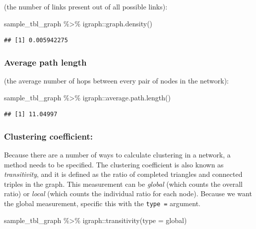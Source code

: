\documentclass[
]{book}
\newenvironment{Shaded}{\begin{snugshade}}{\end{snugshade}}
\newcommand{\AttributeTok}[1]{\textcolor[rgb]{0.77,0.63,0.00}{#1}}
\newcommand{\FunctionTok}[1]{\textcolor[rgb]{0.00,0.00,0.00}{#1}}
\newcommand{\NormalTok}[1]{#1}
\newcommand{\SpecialCharTok}[1]{\textcolor[rgb]{0.00,0.00,0.00}{#1}}
\newcommand{\StringTok}[1]{\textcolor[rgb]{0.31,0.60,0.02}{#1}}
\begin{document}
(the number of links present out of all possible links):

\begin{Shaded}
\begin{Highlighting}[]
\NormalTok{sample\_tbl\_graph }\SpecialCharTok{\%\textgreater{}\%}\NormalTok{ igraph}\SpecialCharTok{::}\FunctionTok{graph.density}\NormalTok{()}
\end{Highlighting}
\end{Shaded}

\begin{verbatim}
## [1] 0.005942275
\end{verbatim}

\hypertarget{average-path-length-1}{%
\subsubsection{Average path length}\label{average-path-length-1}}

(the average number of hops between every pair of nodes in the network):

\begin{Shaded}
\begin{Highlighting}[]
\NormalTok{sample\_tbl\_graph }\SpecialCharTok{\%\textgreater{}\%}\NormalTok{ igraph}\SpecialCharTok{::}\FunctionTok{average.path.length}\NormalTok{()}
\end{Highlighting}
\end{Shaded}

\begin{verbatim}
## [1] 11.04997
\end{verbatim}

\hypertarget{clustering-coefficient-1}{%
\subsubsection{Clustering coefficient:}\label{clustering-coefficient-1}}

Because there are a number of ways to calculate clustering in a network, a method needs to be specified. The clustering coefficient is also known as \emph{transitivity}, and it is defined as the ratio of completed triangles and connected triples in the graph. This measurement can be \emph{global} (which counts the overall ratio) or \emph{local} (which counts the individual ratio for each node). Because we want the global measurement, specific this with the \texttt{type\ =} argument.

\begin{Shaded}
\begin{Highlighting}[]
\NormalTok{sample\_tbl\_graph }\SpecialCharTok{\%\textgreater{}\%}\NormalTok{ igraph}\SpecialCharTok{::}\FunctionTok{transitivity}\NormalTok{(}\AttributeTok{type =} \StringTok{\textquotesingle{}global\textquotesingle{}}\NormalTok{)}
\end{Highlighting}
\end{Shaded}
\end{document}
